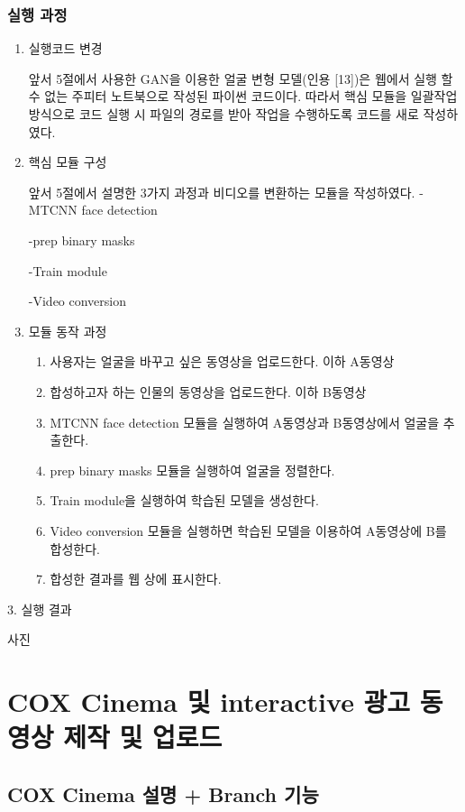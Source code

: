\subsection{실행 과정}
\begin{enumerate}%

    \item 실행코드 변경

    앞서 5절에서 사용한 GAN을 이용한 얼굴 변형 모델(인용 [13])은 웹에서 실행 할 수 없는 주피터 노트북으로 작성된 파이썬 코드이다. 따라서 핵심 모듈을 일괄작업 방식으로 코드 실행 시 파일의 경로를 받아 작업을 수행하도록 코드를 새로 작성하였다.

    \item 핵심 모듈 구성

    앞서 5절에서 설명한 3가지 과정과 비디오를 변환하는 모듈을 작성하였다.
    -MTCNN face detection


    -prep binary masks

    -Train module

    -Video conversion

    \item 모듈 동작 과정
    \begin{enumerate}
        \item  사용자는 얼굴을 바꾸고 싶은 동영상을 업로드한다. 이하 A동영상
        \item 합성하고자 하는 인물의 동영상을 업로드한다. 이하 B동영상
        \item MTCNN face detection 모듈을 실행하여 A동영상과 B동영상에서 얼굴을 추출한다.
        \item prep binary masks 모듈을 실행하여 얼굴을 정렬한다.
        \item Train module을 실행하여 학습된 모델을 생성한다.
        \item Video conversion 모듈을 실행하면 학습된 모델을 이용하여 A동영상에 B를 합성한다.
        \item 합성한 결과를 웹 상에 표시한다.
    \end{enumerate}

\end{enumerate}
3. 실행 결과

사진

\chapter{ COX Cinema 및 interactive 광고 동영상 제작 및 업로드}

\section{ COX Cinema 설명 + Branch 기능}

